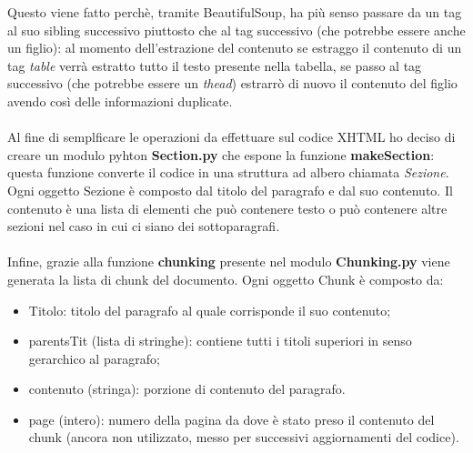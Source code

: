 Questo viene fatto perchè, tramite BeautifulSoup, ha più senso passare da un tag al suo sibling successivo piuttosto che al tag successivo (che potrebbe essere anche un figlio): al momento dell'estrazione del contenuto se estraggo il contenuto di un tag \emph{table} verrà estratto tutto il testo presente nella tabella, se passo al tag successivo (che potrebbe essere un \emph{thead}) estrarrò di nuovo il contenuto del figlio avendo così delle informazioni duplicate.
\\\\Al fine di semplficare le operazioni da effettuare sul codice XHTML ho deciso di creare un modulo pyhton \textbf{Section.py} che espone la funzione \textbf{makeSection}: questa funzione converte il codice in una struttura ad albero chiamata \emph{Sezione}.
Ogni oggetto Sezione è composto dal titolo del paragrafo e dal suo contenuto. Il contenuto è una lista di elementi che può contenere testo o può contenere altre sezioni nel caso in cui ci siano dei sottoparagrafi.
\\\\Infine, grazie alla funzione \textbf{chunking} presente nel modulo \textbf{Chunking.py} viene generata la lista di chunk del documento.
Ogni oggetto Chunk è composto da:
\begin{itemize}
    \item Titolo: titolo del paragrafo al quale corrisponde il suo contenuto;
    \item parentsTit (lista di stringhe): contiene tutti i titoli superiori in senso gerarchico al paragrafo;
    \item contenuto (stringa): porzione di contenuto del paragrafo.
    \item page (intero): numero della pagina da dove è stato preso il contenuto del chunk (ancora non utilizzato, messo per successivi aggiornamenti del codice). 
\end{itemize}

